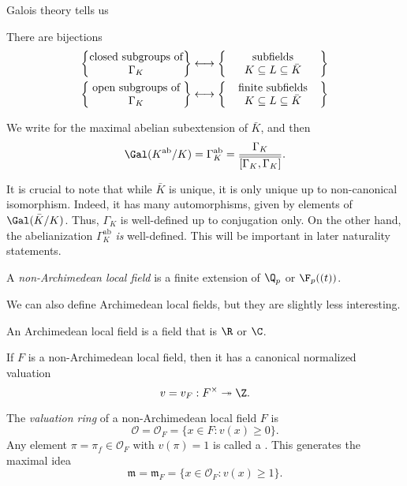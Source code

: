 \documentclass[a4paper]{article}
\newcommand\ab{\mathrm{ab}}
\begin{document}
Galois theory tells us
\begin{thm}
  There are bijections
  \begin{align*}
    \left\{\parbox{3cm}{\centering closed subgroups of $\Gamma_K$}\right\} &\longleftrightarrow \left\{\parbox{3cm}{\centering subfields $K \subseteq L \subseteq \bar{K}$}\right\}\\
    \left\{\parbox{3cm}{\centering open subgroups of $\Gamma_K$}\right\} &\longleftrightarrow \left\{\parbox{3cm}{\centering finite subfields $K \subseteq L \subseteq \bar{K}$}\right\}
  \end{align*}
\end{thm}

\begin{notation}
  We write \term{$K^{\ab}$} for the maximal abelian subextension of $\bar{K}$, and then
  \[
    \Gal(K^{\ab}/K) = \Gamma_K^{\ab} = \frac{\Gamma_K}{\overline{[\Gamma_K, \Gamma_K]}}.
  \]
\end{notation}
It is crucial to note that while $\bar{K}$ is unique, it is only unique up to non-canonical isomorphism. Indeed, it has many automorphisms, given by elements of $\Gal(\bar{K}/K)$. Thus, $\Gamma_K$ is well-defined up to conjugation only. On the other hand, the abelianization $\Gamma_K^{\ab}$ \emph{is} well-defined. This will be important in later naturality statements.

\begin{defi}
  A \emph{non-Archimedean local field} is a finite extension of $\Q_p$ or $\F_p((t))$.
\end{defi}
We can also define Archimedean local fields, but they are slightly less interesting.
\begin{defi}
  An Archimedean local field is a field that is $\R$ or $\C$.
\end{defi}

If $F$ is a non-Archimedean local field, then it has a canonical normalized valuation
\[
  v = v_F: F^\times \twoheadrightarrow \Z.
\]
\begin{defi}
  The \emph{valuation ring} of a non-Archimedean local field $F$ is
  \[
    \mathcal{O} = \mathcal{O}_F = \{x \in F : v(x) \geq 0\}.
  \]
  Any element $\pi = \pi_f \in \mathcal{O}_F$ with $v(\pi) = 1$ is called a . This generates the maximal idea
  \[
    \mathfrak{m} = \mathfrak{m}_F = \{x \in \mathcal{O}_F: v(x) \geq 1\}.
  \]
\end{defi}
\end{document}
